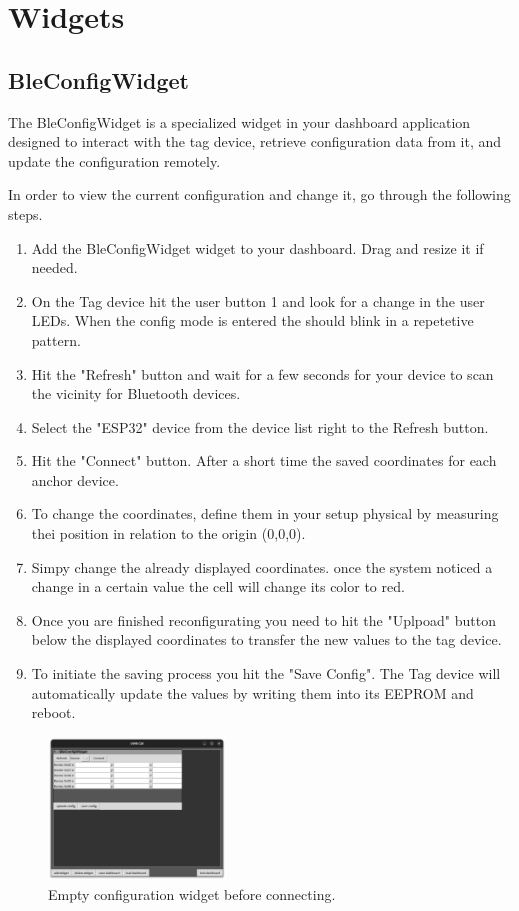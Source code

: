 \chapter{Widgets}

 
\section{BleConfigWidget}

The BleConfigWidget is a specialized widget in your dashboard application designed to interact with the tag device, retrieve configuration data from it, and update the configuration remotely. 

In order to view the current configuration and change it, go through the following steps. 

\begin{enumerate}
	\item Add the BleConfigWidget widget to your dashboard. Drag and resize it if needed. 
	\item On the Tag device hit the user button 1 and look for a change in the user LEDs. When the config mode is entered the should blink in a repetetive pattern. 
	\item Hit the "Refresh" button and wait for a few seconds for your device to scan the vicinity for Bluetooth devices. 
	\item Select the "ESP32" device from the device list right to the Refresh button. 
	\item Hit the "Connect" button. After a short time the saved coordinates for each anchor device. 
	\item To change the coordinates, define them in your setup physical by measuring thei position in relation to the origin (0,0,0). 
	\item Simpy change the already displayed coordinates. once the system noticed a change in a certain value the cell will change its color to red. 
	\item Once you are finished reconfigurating you need to hit the "Uplpoad" button below the displayed coordinates to transfer the new values to the tag device. 
	\item To initiate the saving process you hit the "Save Config". The Tag device will automatically update the values by writing them into its EEPROM and reboot. 
\end{enumerate}

\newpage

\begin{figure}[!hbt]
	\centering
	\includegraphics[width=0.42\textwidth]{pictures/cofig_device_idle.png}
	\caption{Empty configuration widget before connecting.}
	\label{fig:cofig_device_idle}
\end{figure}

